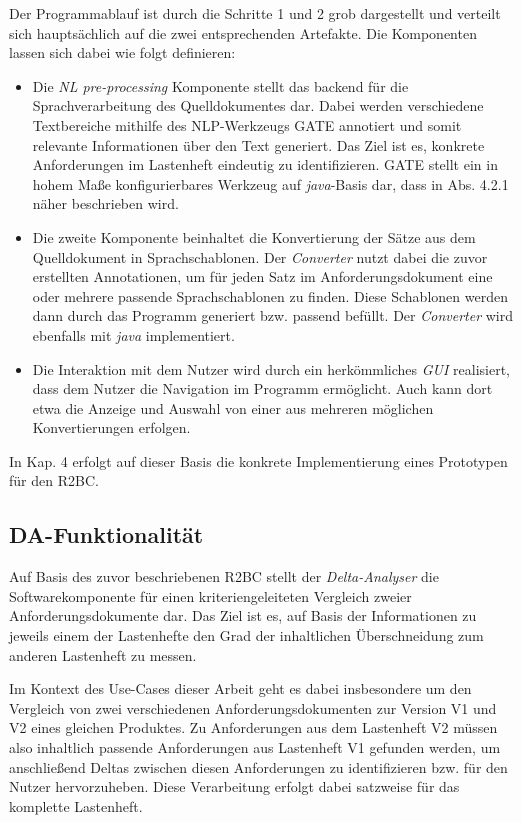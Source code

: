 \documentclass[12pt]{report}
\begin{document}
Der Programmablauf ist durch die Schritte 1 und 2 grob dargestellt und verteilt sich hauptsächlich auf die zwei entsprechenden Artefakte. Die Komponenten lassen sich dabei wie folgt definieren:

\begin{itemize}
\item Die \textit{NL pre-processing} Komponente stellt das backend für die Sprachverarbeitung des Quelldokumentes dar. Dabei werden verschiedene Textbereiche mithilfe des NLP-Werkzeugs GATE annotiert und somit relevante Informationen über den Text generiert. Das Ziel ist es, konkrete Anforderungen im Lastenheft eindeutig zu identifizieren. GATE stellt ein in hohem Maße konfigurierbares Werkzeug auf \textit{java}-Basis dar, dass in Abs. 4.2.1 näher beschrieben wird.
\item Die zweite Komponente beinhaltet die Konvertierung der Sätze aus dem Quelldokument in Sprachschablonen. Der \textit{Converter} nutzt dabei die zuvor erstellten Annotationen, um für jeden Satz im Anforderungsdokument eine oder mehrere passende Sprachschablonen zu finden. Diese Schablonen werden dann durch das Programm generiert bzw. passend \glqq befüllt\grqq{}. Der \textit{Converter} wird ebenfalls mit \textit{java} implementiert.
\item Die Interaktion mit dem Nutzer wird durch ein herkömmliches \textit{GUI} realisiert, dass dem Nutzer die Navigation im Programm ermöglicht. Auch kann dort etwa die Anzeige und Auswahl von einer aus mehreren möglichen Konvertierungen erfolgen.
\end{itemize}

In Kap. 4 erfolgt auf dieser Basis die konkrete Implementierung eines Prototypen für den R2BC.

\subsection{DA-Funktionalität}
Auf Basis des zuvor beschriebenen R2BC stellt der \textit{Delta-Analyser} die Softwarekomponente für einen kriteriengeleiteten Vergleich zweier Anforderungsdokumente dar. Das Ziel ist es, auf Basis der Informationen zu jeweils einem der Lastenhefte den Grad der inhaltlichen Überschneidung zum anderen Lastenheft zu messen. 

Im Kontext des Use-Cases dieser Arbeit geht es dabei insbesondere um den Vergleich von zwei verschiedenen Anforderungsdokumenten zur Version V1 und V2 eines gleichen Produktes. Zu Anforderungen aus dem Lastenheft V2 müssen also inhaltlich passende Anforderungen aus Lastenheft V1 gefunden werden, um anschließend Deltas zwischen diesen Anforderungen zu identifizieren bzw. für den Nutzer hervorzuheben. Diese Verarbeitung erfolgt dabei satzweise für das komplette Lastenheft. 
\end{document}
